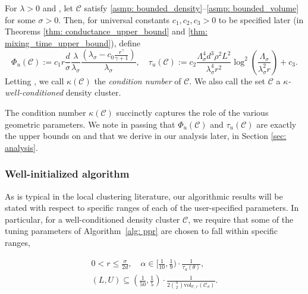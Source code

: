 \documentclass[11pt,twoside]{article}
\newcommand{\vol}{\mathrm{vol}}
\newcommand{\1}{\mathbbm{1}}
\newcommand{\Phibf}{\Phi_{u}}
\newcommand{\taubf}{\tau_{u}}
\newcommand{\Xbf}{X}
\newcommand{\Pbb}{\mathbb{P}}
\newcommand{\Cbb}{\mathbb{C}}
\newcommand{\Cset}{\mathcal{C}}
\newcommand{\Csig}{\Cset_{\sigma}}
\begin{document}
\begin{definition}
  \label{def:well_conditioned_density_cluster}
  For $\lambda > 0$ and \smash{$\Cset \in \Cbb_f(\lambda)$}, let $\Cset$ satisfy  
  \ref{asmp: bounded_density}--\ref{asmp: bounded_volume} for some $\sigma >
  0$. Then, for universal constants $c_1, c_2, c_3 > 0$ to be specified later
  (in Theorems \ref{thm: conductance_upper_bound} and \ref{thm:
    mixing_time_upper_bound}), define
  \begin{equation}
    \label{eqn: condition_number}
    \Phibf(\Cset) 
    := c_1 r \frac{d}{\sigma} \frac{\lambda}{\lambda_{\sigma}}
    \frac{(\lambda_{\sigma} - c_0 \frac{r^{\gamma}}{\gamma +
        1})}{\lambda_{\sigma}}, \quad
    \taubf(\Cset) := c_2 \frac{\Lambda_{\sigma}^4 d^3 \rho^2
      L^2}{\lambda_{\sigma}^4 r^2}
    \log^2\left(\frac{\Lambda_{\sigma}}{\lambda_{\sigma}^2r}\right) + c_3.
  \end{equation}
  Letting \smash{$\kappa(\Cset) := \Phibf(\Cset) \cdot \taubf(\Cset)$},
  we call $\kappa(\Cset)$ the \emph{condition number} of $\Cset$.  We also call
  the set $\Cset$ a \emph{$\kappa$-well-conditioned} density cluster.  
\end{definition}

The condition number $\kappa(\Cset)$ succinctly captures the role of the various 
geometric parameters.  We note in passing that $\Phibf(\Cset)$ and
$\taubf(\Cset)$ are exactly the upper bounds  on \smash{$\Phi(\Csig[\Xbf];
  G_{n,r})$} and \smash{$\tau_{\infty}(G_{n,r}[\Csig[\Xbf]])$} that we derive in
our analysis later, in Section \ref{sec: analysis}. 

\subsubsection{Well-initialized algorithm} 

As is typical in the local clustering literature, our algorithmic results will
be stated with respect to specific ranges of each of the user-specified
parameters. In particular, for a well-conditioned density cluster $\Cset$, we
require that some of the tuning parameters of Algorithm~\ref{alg: ppr} are
chosen to fall within specific ranges,

\begin{equation}
\begin{gathered}
\label{eqn: initialization}
0 < r \leq \frac{\sigma}{2d}, \quad 
\alpha \in {\textstyle [\frac{1}{10}, \frac{1}{9})} \cdot
\frac{1}{\taubf(\theta)}, \\ 
(L,U) \subseteq {\textstyle(\frac{1}{50},\frac{1}{5})} \cdot 
\frac{1}{2{n \choose 2} \vol_{\Pbb,r}(\Csig)}.  
\end{gathered}
\end{equation}
\end{document}
